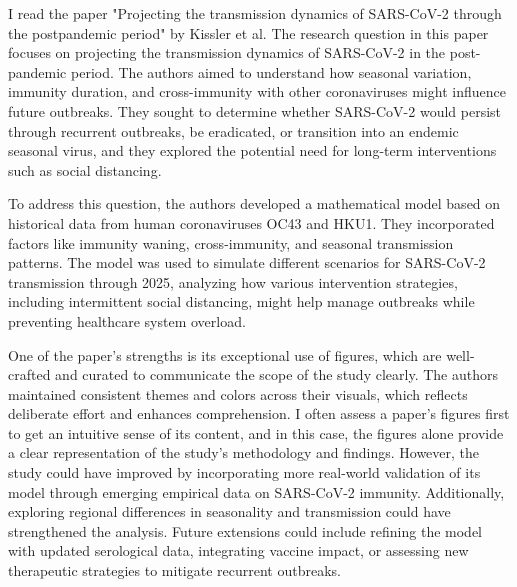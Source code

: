 \documentclass[12pt]{article}
\begin{document}
I read the paper "Projecting the transmission dynamics of SARS-CoV-2 through the postpandemic period" by Kissler et al. The research question in this paper focuses on projecting the transmission dynamics of SARS-CoV-2 in the post-pandemic period. The authors aimed to understand how seasonal variation, immunity duration, and cross-immunity with other coronaviruses might influence future outbreaks. They sought to determine whether SARS-CoV-2 would persist through recurrent outbreaks, be eradicated, or transition into an endemic seasonal virus, and they explored the potential need for long-term interventions such as social distancing.

To address this question, the authors developed a mathematical model based on historical data from human coronaviruses OC43 and HKU1. They incorporated factors like immunity waning, cross-immunity, and seasonal transmission patterns. The model was used to simulate different scenarios for SARS-CoV-2 transmission through 2025, analyzing how various intervention strategies, including intermittent social distancing, might help manage outbreaks while preventing healthcare system overload.

One of the paper’s strengths is its exceptional use of figures, which are well-crafted and curated to communicate the scope of the study clearly. The authors maintained consistent themes and colors across their visuals, which reflects deliberate effort and enhances comprehension. I often assess a paper’s figures first to get an intuitive sense of its content, and in this case, the figures alone provide a clear representation of the study’s methodology and findings. However, the study could have improved by incorporating more real-world validation of its model through emerging empirical data on SARS-CoV-2 immunity. Additionally, exploring regional differences in seasonality and transmission could have strengthened the analysis. Future extensions could include refining the model with updated serological data, integrating vaccine impact, or assessing new therapeutic strategies to mitigate recurrent outbreaks.
\end{document}
